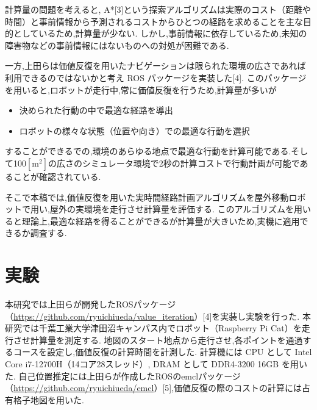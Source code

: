 \documentclass{jarticle}
\begin{document}
計算量の問題を考えると, A*[3]という探索アルゴリズムは実際のコスト（距離や時間）と事前情報から予測されるコストからひとつの経路を求めることを主な目的としているため,計算量が少ない.
しかし,事前情報に依存しているため,未知の障害物などの事前情報にはないものへの対処が困難である.

一方,上田らは価値反復を用いたナビゲーションは限られた環境の広さであれば利用できるのではないかと考え ROS パッケージを実装した[4].
このパッケージを用いると,ロボットが走行中,常に価値反復を行うため,計算量が多いが
\begin{itemize}
	\item 決められた行動の中で最適な経路を導出
	\item ロボットの様々な状態（位置や向き）での最適な行動を選択
 \end{itemize}
することができるでの,環境のあらゆる地点で最適な行動を計算可能である.そして100$\mathrm{[m^2]}$の広さのシミュレータ環境で2秒の計算コストで行動計画が可能であることが確認されている.

そこで本稿では,価値反復を用いた実時間経路計画アルゴリズムを屋外移動ロボットで用い,屋外の実環境を走行させ計算量を評価する.
このアルゴリズムを用いると理論上,最適な経路を得ることができるが計算量が大きいため,実機に適用できるか調査する.



\section{実験}%
本研究では上田らが開発したROSパッケージ（\href{https://github.com/ryuichiueda/value_iteration}{https://github.com/ryuichiueda/value\_iteration}）[4]を実装し実験を行った.
本研究では千葉工業大学津田沼キャンパス内でロボット（Raspberry Pi Cat）を走行させ計算量を測定する.
地図のスタート地点から走行させ,各ポイントを通過するコースを設定し,価値反復の計算時間を計測した.
計算機には CPU として Intel Core i7-12700H（14コア28スレッド）, DRAM として DDR4-3200 16GB を用いた.
自己位置推定には上田らが作成したROSのemclパッケージ（\href{https://github.com/ryuichiueda/emcl}{https://github.com/ryuichiueda/emcl}）[5],価値反復の際のコストの計算には占有格子地図を用いた.
\end{document}
